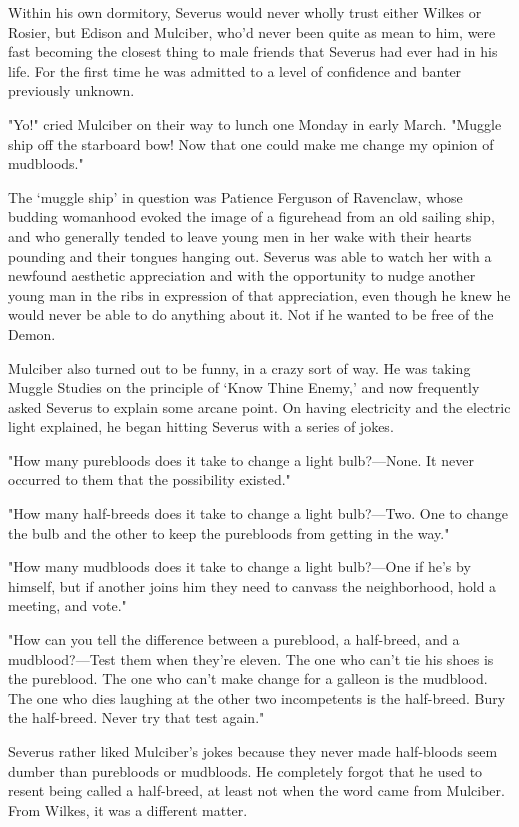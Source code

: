 Within his own dormitory, Severus would never wholly trust either Wilkes or Rosier, but Edison and Mulciber, who'd never been quite as mean to him, were fast becoming the closest thing to male friends that Severus had ever had in his life. For the first time he was admitted to a level of confidence and banter previously unknown.

"Yo!" cried Mulciber on their way to lunch one Monday in early March. "Muggle ship off the starboard bow! Now that one could make me change my opinion of mudbloods."

The `muggle ship' in question was Patience Ferguson of Ravenclaw, whose budding womanhood evoked the image of a figurehead from an old sailing ship, and who generally tended to leave young men in her wake with their hearts pounding and their tongues hanging out. Severus was able to watch her with a newfound aesthetic appreciation and with the opportunity to nudge another young man in the ribs in expression of that appreciation, even though he knew he would never be able to do anything about it. Not if he wanted to be free of the Demon.

Mulciber also turned out to be funny, in a crazy sort of way. He was taking Muggle Studies on the principle of `Know Thine Enemy,' and now frequently asked Severus to explain some arcane point. On having electricity and the electric light explained, he began hitting Severus with a series of jokes.

"How many purebloods does it take to change a light bulb?—None. It never occurred to them that the possibility existed."

"How many half-breeds does it take to change a light bulb?—Two. One to change the bulb and the other to keep the purebloods from getting in the way."

"How many mudbloods does it take to change a light bulb?—One if he's by himself, but if another joins him they need to canvass the neighborhood, hold a meeting, and vote."

"How can you tell the difference between a pureblood, a half-breed, and a mudblood?—Test them when they're eleven. The one who can't tie his shoes is the pureblood. The one who can't make change for a galleon is the mudblood. The one who dies laughing at the other two incompetents is the half-breed. Bury the half-breed. Never try that test again."

Severus rather liked Mulciber's jokes because they never made half-bloods seem dumber than purebloods or mudbloods. He completely forgot that he used to resent being called a half-breed, at least not when the word came from Mulciber. From Wilkes, it was a different matter.

